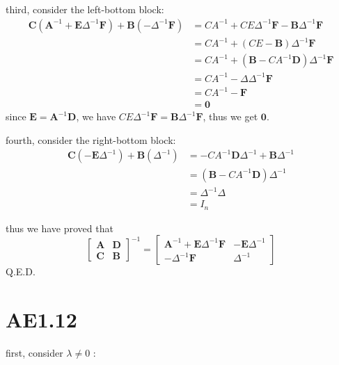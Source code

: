 \documentclass[12pt,a4paper]{article}
\begin{document}
third, consider the left-bottom block:
\[
    \begin{aligned}
        \mathbf{\mathbf{C}}(\mathbf{A}^{-1}+\mathbf{E}\Delta^{-1}\mathbf{F}) + \mathbf{B}(-\Delta^{-1}\mathbf{F}) & = CA^{-1} + CE\Delta^{-1}\mathbf{F} - \mathbf{B}\Delta^{-1}\mathbf{F} \\
                                                & = CA^{-1} + (CE - \mathbf{B})\Delta^{-1}\mathbf{F} \\
                                                & = CA^{-1} + (\mathbf{B} - CA^{-1}\mathbf{D})\Delta^{-1}\mathbf{F} \\
                                                & = CA^{-1} - \Delta \Delta^{-1} \mathbf{F} \\
                                                & = CA^{-1} - \mathbf{F} \\
                                                & = \mathbf{0}
    \end{aligned}
\]
since $\mathbf{E} = \mathbf{A}^{-1}\mathbf{D}$, we have $CE\Delta^{-1}\mathbf{F} = \mathbf{B}\Delta^{-1}\mathbf{F}$, thus we get $\mathbf{0}$.

fourth, consider the right-bottom block:
\[
    \begin{aligned}
        \mathbf{\mathbf{C}}(-\mathbf{E}\Delta^{-1}) + \mathbf{B}(\Delta^{-1}) & = -CA^{-1}\mathbf{D}\Delta^{-1} + \mathbf{B}\Delta^{-1} \\
                                          & = (\mathbf{B} - CA^{-1}\mathbf{D})\Delta^{-1} \\
                                          & = \Delta^{-1}\Delta \\
                                          & = I_n
    \end{aligned}
\]

thus we have proved that
\[
    \begin{bmatrix}
        \mathbf{A} & \mathbf{D} \\
        \mathbf{\mathbf{C}} & \mathbf{B}
    \end{bmatrix}^{-1} = \begin{bmatrix}
        \mathbf{A}^{-1}+\mathbf{E}\Delta^{-1}\mathbf{F} & -\mathbf{E}\Delta^{-1} \\
        -\Delta^{-1}\mathbf{F} & \Delta^{-1}
    \end{bmatrix}
\]
Q.E.D.

\section{AE1.12}
first, consider $\lambda \neq 0$ :
\end{document}
